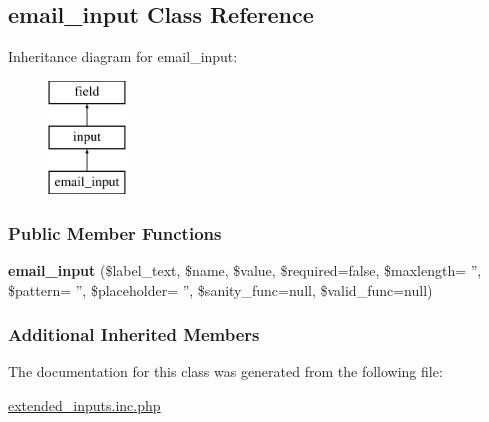 \hypertarget{classemail__input}{\subsection{email\-\_\-input Class Reference}
\label{classemail__input}
}
Inheritance diagram for email\-\_\-input\-:\begin{figure}[H]
\begin{center}
\leavevmode
\includegraphics[height=3.000000cm]{classemail__input}
\end{center}
\end{figure}
\subsubsection*{Public Member Functions}
\begin{DoxyCompactItemize}
\item 
\hypertarget{classemail__input_a4ab958970ce98b796f6002cf58f82c74}{{\bfseries email\-\_\-input} (\$label\-\_\-text, \$name, \$value, \$required=false, \$maxlength= '', \$pattern= '', \$placeholder= '', \$sanity\-\_\-func=null, \$valid\-\_\-func=null)}\label{classemail__input_a4ab958970ce98b796f6002cf58f82c74}

\end{DoxyCompactItemize}
\subsubsection*{Additional Inherited Members}


The documentation for this class was generated from the following file\-:\begin{DoxyCompactItemize}
\item 
\hyperlink{extended__inputs_8inc_8php}{extended\-\_\-inputs.\-inc.\-php}\end{DoxyCompactItemize}
